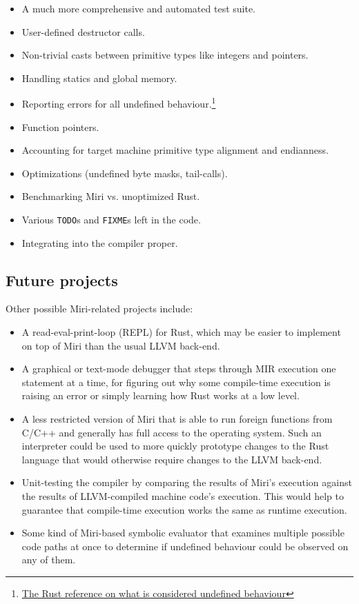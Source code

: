 \documentclass[twocolumn]{article}
\begin{document}
\begin{itemize}
  \item A much more comprehensive and automated test suite.
  \item User-defined destructor calls.
  \item Non-trivial casts between primitive types like integers and pointers.
  \item Handling statics and global memory.
  \item Reporting errors for all undefined behaviour.\footnote{\href{https://doc.rust-lang.org/reference.html\#behavior-considered-undefined}{The Rust reference on what is considered undefined behaviour}}
  \item Function pointers.
  \item Accounting for target machine primitive type alignment and endianness.
  \item Optimizations (undefined byte masks, tail-calls).
  \item Benchmarking Miri vs. unoptimized Rust.
  \item Various \texttt{TODO}s and \texttt{FIXME}s left in the code.
  \item Integrating into the compiler proper.
\end{itemize}

\subsection{Future projects}

Other possible Miri-related projects include:

\begin{itemize}
  \item A read-eval-print-loop (REPL) for Rust, which may be easier to implement on top of Miri than
    the usual LLVM back-end.
  \item A graphical or text-mode debugger that steps through MIR execution one statement at a time,
    for figuring out why some compile-time execution is raising an error or simply learning how Rust
    works at a low level.
  \item A less restricted version of Miri that is able to run foreign functions from C/C++ and
    generally has full access to the operating system. Such an interpreter could be used to more
    quickly prototype changes to the Rust language that would otherwise require changes to the LLVM
    back-end.
  \item Unit-testing the compiler by comparing the results of Miri's execution against the results
    of LLVM-compiled machine code's execution. This would help to guarantee that compile-time
    execution works the same as runtime execution.
  \item Some kind of Miri-based symbolic evaluator that examines multiple possible code paths at
    once to determine if undefined behaviour could be observed on any of them.
\end{itemize}
\end{document}
